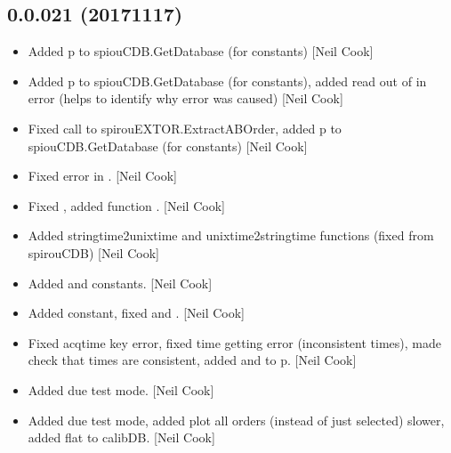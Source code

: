 \documentclass[a4paper,10pt,english]{report}
\begin{document}
\subsection{0.0.021 (2017\sphinxhyphen{}11\sphinxhyphen{}17)}
\label{\detokenize{misc/changelog:id549}}\begin{itemize}
\item {} 
Added p to spiouCDB.GetDatabase (for  constants) {[}Neil Cook{]}

\item {} 
Added p to spiouCDB.GetDatabase (for  constants), added read
out of  in error (helps to identify why error was caused)
{[}Neil Cook{]}

\item {} 
Fixed call to spirouEXTOR.ExtractABOrder, added p to
spiouCDB.GetDatabase (for  constants) {[}Neil Cook{]}

\item {} 
Fixed error in . {[}Neil Cook{]}

\item {} 
Fixed , added function
. {[}Neil Cook{]}

\item {} 
Added stringtime2unixtime and unixtime2stringtime functions (fixed
from spirouCDB) {[}Neil Cook{]}

\item {} 
Added  and  constants. {[}Neil Cook{]}

\item {} 
Added  constant, fixed  and
. {[}Neil Cook{]}

\item {} 
Fixed acqtime key error, fixed time getting error (inconsistent
times), made check that times are consistent, added  and
 to p. {[}Neil Cook{]}

\item {} 
Added due test mode. {[}Neil Cook{]}

\item {} 
Added due test mode, added plot all orders (instead of just selected)
\sphinxhyphen{} slower, added flat to calibDB. {[}Neil Cook{]}


\end{itemize}
\end{document}
